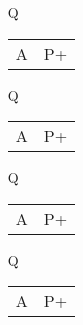 \documentclass{article}
\begin{document}
\begin{multicols}{4}
\begin{enumerate}
\item[Q] \begin{tabular}{cc} A & P+\end{tabular}
\item[Q] \begin{tabular}{cc} A & P+\end{tabular}
\item[Q] \begin{tabular}{cc} A & P+\end{tabular}
\item[Q] \begin{tabular}{cc} A & P+\end{tabular}
\end{enumerate}
\end{multicols}
\end{document}
